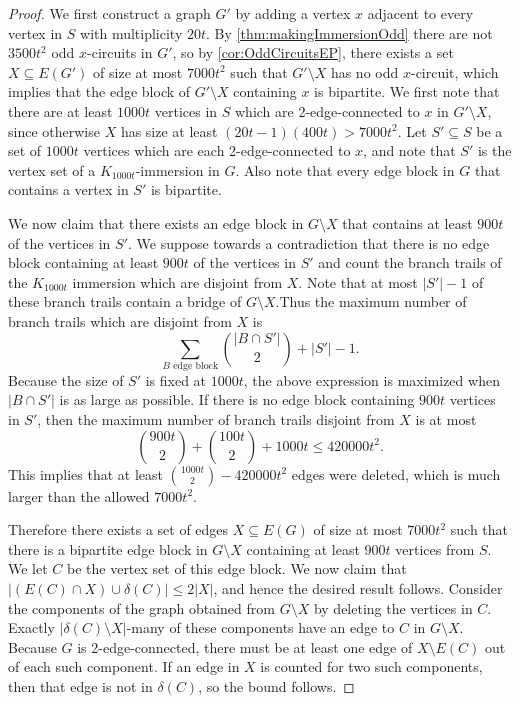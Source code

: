 \documentclass[10pt,a4paper]{amsart}
\begin{document}
\begin{proof}
    We first construct a graph $G'$ by adding a vertex $x$ adjacent to every vertex in $S$ with multiplicity $20t$. By \cref{thm:makingImmersionOdd} there are not $3500t^2$ odd $x$-circuits in $G'$, so by \cref{cor:OddCircuitsEP}, there exists a set $X \subseteq E(G')$ of size at most $7000t^2$ such that $G' \setminus X$ has no odd $x$-circuit, which implies that the edge block of $G' \setminus X$ containing $x$ is bipartite. We first note that there are at least $1000t$ vertices in $S$ which are 2-edge-connected to $x$ in $G' \setminus X$, since otherwise $X$ has size at least $(20t-1)(400t) > 7000t^2$. Let $S' \subseteq S$ be a set of $1000t$ vertices which are each 2-edge-connected to $x$, and note that $S'$ is the vertex set of a $K_{1000t}$-immersion in $G$. Also note that every edge block in $G$ that contains a vertex in $S'$ is bipartite.
    
    We now claim that there exists an edge block in $G \setminus X$ that contains at least $900t$ of the vertices in $S'$. We suppose towards a contradiction that there is no edge block containing at least $900t$ of the vertices in $S'$ and count the branch trails of the $K_{1000t}$ immersion which are disjoint from $X$. Note that at most $|S'|-1$ of these branch trails contain a bridge of $G\setminus X$.Thus the maximum number of branch trails which are disjoint from $X$ is
    $$\sum_{B\text{ edge block}} \binom{|B \cap S'|}{2} + |S'| - 1.$$
    Because the size of $S'$ is fixed at $1000t$, the above expression is maximized when $|B \cap S'|$ is as large as possible. If there is no edge block containing $900t$ vertices in $S'$, then the maximum number of branch trails disjoint from $X$ is at most
    $$\binom{900t}{2} + \binom{100t}{2} + 1000t \leq 420000t^2.$$
    This implies that at least $\binom{1000t}{2} - 420000t^2$ edges were deleted, which is much larger than the allowed $7000t^2$.

    Therefore there exists a set of edges $X \subseteq E(G)$ of size at most $7000t^2$ such that there is a bipartite edge block in $G \setminus X$ containing at least $900t$ vertices from $S$. We let $C$ be the vertex set of this edge block. We now claim that $|(E(C) \cap X) \cup \delta(C)| \leq 2|X|$, and hence the desired result follows. Consider the components of the graph obtained from $G\setminus X$ by deleting the vertices in $C$. Exactly $|\delta(C)\setminus X|$-many of these components have an edge to $C$ in $G\setminus X$. Because $G$ is 2-edge-connected, there must be at least one edge of $X \setminus E(C)$ out of each such component. If an edge in $X$ is counted for two such components, then that edge is not in $\delta(C)$, so the bound follows.
\end{proof}
\end{document}
